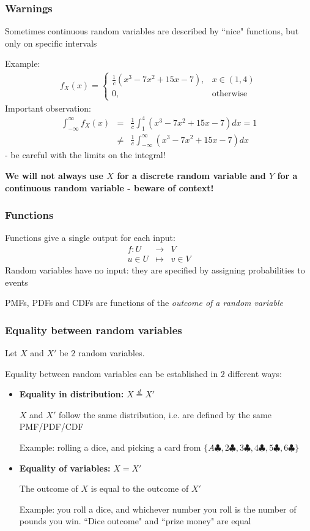 \documentclass[t,8pt]{beamer}%
\begin{document}
\begin{frame}
\frametitle{Warnings}
\color{gray}
Sometimes continuous random variables are described by ``nice" functions, but only on specific intervals \par
Example:
\begin{eqnarray*}
    f_X(x) = \left\{\begin{array}{lr}
			\frac 1c(x^3-7x^2+15x-7), & x\in(1,4)\\
			0, & \text{otherwise}
		\end{array}\right.
\end{eqnarray*}
\color{black}
Important observation:
\begin{eqnarray*}
    \int_{-\infty}^{\infty}f_X(x)&=&\frac 1c\int_1^4(x^3-7x^2+15x-7)dx=1\\
    &\neq&\frac 1c\int_{-\infty}^{\infty}(x^3-7x^2+15x-7)dx
\end{eqnarray*}
- be careful with the limits on the integral! \par
{\bf We will not always use $X$ for a discrete random variable and $Y$ for a continuous random variable - beware of context!}
\end{frame}

\begin{frame}
\frametitle{Functions}
Functions give a single output for each input:
\begin{eqnarray*}
    f:U&\rightarrow& V\\
    u\in U&\mapsto& v\in V
\end{eqnarray*}
Random variables have no input: they are specified by assigning probabilities to events \par
PMFs, PDFs and CDFs are functions of the \it{outcome} of a random variable \par
\end{frame}

\begin{frame}
\frametitle{Equality between random variables}
Let $X$ and $X'$ be $2$ random variables. \par
Equality between random variables can be established in $2$ different ways:
\begin{itemize}
    \item {\bf Equality in distribution:} $X\stackrel{d}{=}X'$ \par
    $X$ and $X'$ follow the same distribution, i.e. are defined by the same PMF/PDF/CDF \par
    Example: rolling a dice, and picking a card from $\{A\clubsuit,2\clubsuit,3\clubsuit,4\clubsuit,5\clubsuit,6\clubsuit\}$
    \item {\bf Equality of variables:} $X=X'$ \par
    The outcome of $X$ is equal to the outcome of $X'$ \par
    Example: you roll a dice, and whichever number you roll is the number of pounds you win. ``Dice outcome" and ``prize money" are equal
\end{itemize}

\end{frame}
\end{document}
